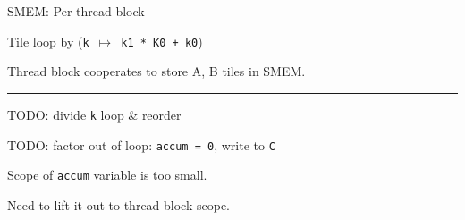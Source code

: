 \newpage
{}

{\LARGE

SMEM: Per-thread-block 

Tile  loop by  (\texttt{k $\mapsto$ k1 * K0 + k0})

Thread block cooperates to store A, B tiles in SMEM.

}

\vfill

\begin{center}
\begin{tikzpicture}[node distance=2mm]

\end{tikzpicture}
\end{center}

\newpage
\begin{center}
\Large
{}
\end{center}

\vfill
\hrule
\vfill

\begin{center}
\begin{tikzpicture}[node distance=2mm]

\end{tikzpicture}
\end{center}

\newpage
{}

{\large

}

{\LARGE
TODO: divide \texttt{k} loop \& reorder

TODO: factor out of  loop: \texttt{accum = 0}, write to \texttt{C}

}

\newpage
{}

{\large

}

{\LARGE
Scope of \texttt{accum} variable is too small.

Need to lift it out to thread-block scope.

}

\newpage
{}

{\large

}

